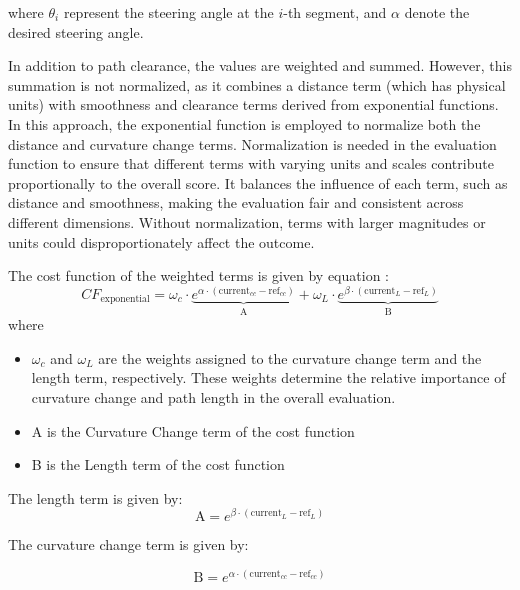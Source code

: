 where \( \theta_i \) represent the steering angle at the \(i\)-th segment, and \( \alpha \) denote the desired 
steering angle.

In addition to path clearance, the values are weighted and summed. However, this summation is not normalized, 
as it combines a distance term (which has physical units) with smoothness and clearance terms derived from 
exponential functions. In this approach, the exponential function is employed to normalize both the distance 
and curvature change terms. Normalization is needed in the evaluation function to ensure that different terms 
with varying units and scales contribute proportionally to the overall score. It balances the influence of each 
term, such as distance and smoothness, making the evaluation fair and consistent across different dimensions. 
Without normalization, terms with larger magnitudes or units could disproportionately affect the outcome.

\noindent The cost function of the weighted terms is given by equation :
\begin{equation}
    CF_{\text{exponential}} = \omega_{c} \cdot \underbrace{e^{\alpha \cdot \left( \text{current}_{cc} - \text{ref}_{cc} \right)}}_{\text{A}} + \omega_{L} \cdot \underbrace{e^{\beta \cdot \left( \text{current}_L - \text{ref}_L \right)}}_{\text{B}}
    \label{exp_Costfunction}
\end{equation}
where \begin{itemize}
    \item \(\omega_c\) and \(\omega_L\) are the weights assigned to the curvature change term and the length term, 
    respectively. These weights determine the relative importance of curvature change and path length in the overall 
    evaluation. 
    \item A is the Curvature Change term of the cost function
    \item B is the Length term of the cost function
\end{itemize}

The length term is given by:
\begin{equation}
    \text{A} = e^{\beta \cdot \left(\text{current}_L - \text{ref}_L\right)}
    \end{equation}
    
The curvature change term is given by:
    \noindent
    
    \begin{equation}
    \text{B} = e^{\alpha \cdot \left(\text{current}_{cc} - \text{ref}_{cc}\right)}
    \end{equation}
    
